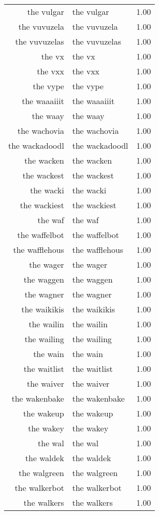 \begin{table}[ht]
\begin{tabular}{rlr}
  the vulgar & the vulgar & 1.00 \\ 
  the vuvuzela & the vuvuzela & 1.00 \\ 
  the vuvuzelas & the vuvuzelas & 1.00 \\ 
  the vx & the vx & 1.00 \\ 
  the vxx & the vxx & 1.00 \\ 
  the vype & the vype & 1.00 \\ 
  the waaaiiit & the waaaiiit & 1.00 \\ 
  the waay & the waay & 1.00 \\ 
  the wachovia & the wachovia & 1.00 \\ 
  the wackadoodl & the wackadoodl & 1.00 \\ 
  the wacken & the wacken & 1.00 \\ 
  the wackest & the wackest & 1.00 \\ 
  the wacki & the wacki & 1.00 \\ 
  the wackiest & the wackiest & 1.00 \\ 
  the waf & the waf & 1.00 \\ 
  the waffelbot & the waffelbot & 1.00 \\ 
  the wafflehous & the wafflehous & 1.00 \\ 
  the wager & the wager & 1.00 \\ 
  the waggen & the waggen & 1.00 \\ 
  the wagner & the wagner & 1.00 \\ 
  the waikikis & the waikikis & 1.00 \\ 
  the wailin & the wailin & 1.00 \\ 
  the wailing & the wailing & 1.00 \\ 
  the wain & the wain & 1.00 \\ 
  the waitlist & the waitlist & 1.00 \\ 
  the waiver & the waiver & 1.00 \\ 
  the wakenbake & the wakenbake & 1.00 \\ 
  the wakeup & the wakeup & 1.00 \\ 
  the wakey & the wakey & 1.00 \\ 
  the wal & the wal & 1.00 \\ 
  the waldek & the waldek & 1.00 \\ 
  the walgreen & the walgreen & 1.00 \\ 
  the walkerbot & the walkerbot & 1.00 \\ 
  the walkers & the walkers & 1.00 \\ 

\end{tabular}
\end{table}
